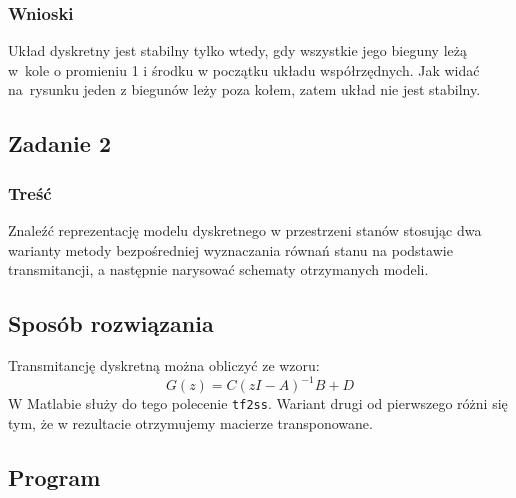 \documentclass{article}
\begin{document}
\subsubsection{Wnioski}
Układ dyskretny jest stabilny tylko wtedy, gdy wszystkie jego bieguny leżą w~kole o promieniu 1 i środku w początku układu współrzędnych. Jak widać na~rysunku jeden z biegunów leży poza kołem, zatem układ nie jest stabilny.
\subsection{Zadanie 2}
\subsubsection{Treść}
Znaleźć reprezentację modelu dyskretnego w przestrzeni stanów stosując dwa warianty
metody bezpośredniej wyznaczania równań stanu na podstawie transmitancji, a następnie
narysować schematy otrzymanych modeli.
\subsection{Sposób rozwiązania}
Transmitancję dyskretną można obliczyć ze wzoru:
$$
G(z)=C(zI-A)^{-1}B+D
$$
W Matlabie służy do tego polecenie \verb+tf2ss+.
Wariant drugi od pierwszego różni się tym, że w rezultacie otrzymujemy macierze transponowane.
\subsection{Program}

\end{document}
